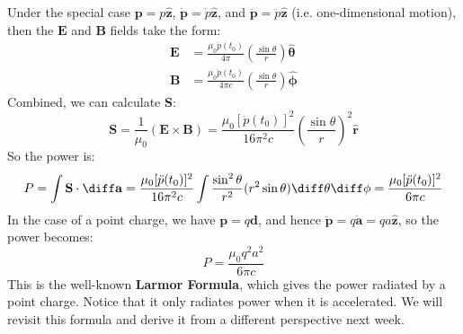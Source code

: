 \begin{example}
	Under the special case \( \mathbf{p} = p \mathbf{\hat{z}} \), \( \dot{\mathbf{p}} = \dot{p}
	\mathbf{\hat{z}} \), and \( \ddot{\mathbf{p}} = \ddot{p} \mathbf{\hat{z}} \) (i.e. one-dimensional motion),
	then the \( \mathbf{E} \) and \( \mathbf{B} \) fields take the form:
	\begin{align*}
		\mathbf{E} &= \frac{\mu_0 \ddot p(t_0)}{4\pi}\left( \frac{\sin \theta}{r} \right)
		\boldsymbol{\hat{\theta}} \\ 
		\mathbf{B} &= \frac{\mu_0 \ddot p(t_0)}{4\pi c}\left( \frac{\sin \theta}{r} \right)\boldsymbol{\hat{\phi}} 
	\end{align*}
	Combined, we can calculate \( \mathbf{S} \):
	\[
		\mathbf{S} = \frac{1}{\mu_0}(\mathbf{E} \times \mathbf{B}) = \frac{\mu_0 [\ddot{p}(t_0)]^2}{16 \pi^2
		c}\left( \frac{\sin \theta}{r} \right)^2 \mathbf{\hat{r}}
	\]
	So the power is:
	\[
		P = \int \mathbf{S} \cdot \diff \mathbf{a} = \frac{\mu_0 [\ddot{p}(t_0)]^2}{16 \pi^2 c} \int \frac{\sin^2
		\theta}{r^2} (r^2 \sin \theta) \diff \theta \diff \phi = \frac{\mu_0 [\ddot p(t_0)]^2}{6 \pi c}
	\]
	In the case of a point charge, we have \( \mathbf{p} = q \mathbf{d} \), and hence \( \ddot{\mathbf{p}} =
	q \ddot{\mathbf{a}} = qa \mathbf{\hat{z}} \), so the power becomes:
	\begin{equation}
		\label{Larmor}
		P = \frac{\mu_0 q^2 a^2}{6 \pi c}
	\end{equation}
	This is the well-known \textbf{Larmor Formula}, which gives the power radiated by a point charge. Notice
	that it only radiates power when it is accelerated. We will revisit this formula and derive it from a
	different perspective next week.
\end{example}

 
 
 
